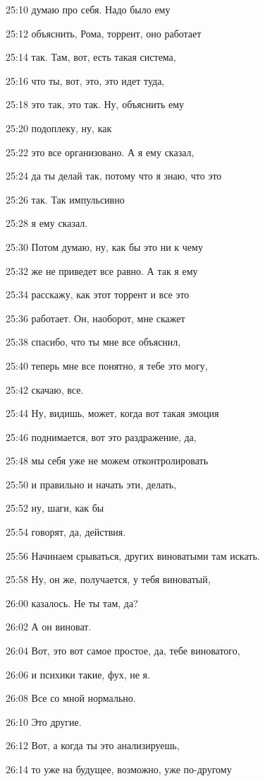 25:10
думаю про себя. Надо было ему

25:12
объяснить, Рома, торрент, оно работает

25:14
так. Там, вот, есть такая система,

25:16
что ты, вот, это, это идет туда,

25:18
это так, это так. Ну, объяснить ему

25:20
подоплеку, ну, как

25:22
это все организовано. А я ему сказал,

25:24
да ты делай так, потому что я знаю, что это

25:26
так. Так импульсивно

25:28
я ему сказал.

25:30
Потом думаю, ну, как бы это ни к чему

25:32
же не приведет все равно. А так я ему

25:34
расскажу, как этот торрент и все это

25:36
работает. Он, наоборот, мне скажет

25:38
спасибо, что ты мне все объяснил,

25:40
теперь мне все понятно, я тебе это могу,

25:42
скачаю, все.

25:44
Ну, видишь, может, когда вот такая эмоция

25:46
поднимается, вот это раздражение, да,

25:48
мы себя уже не можем отконтролировать

25:50
и правильно и начать эти, делать,

25:52
ну, шаги, как бы

25:54
говорят, да, действия.

25:56
Начинаем срываться, других виноватыми там искать.

25:58
Ну, он же, получается, у тебя виноватый,

26:00
казалось. Не ты там, да?

26:02
А он виноват.

26:04
Вот, это вот самое простое, да, тебе виноватого,

26:06
и психики такие, фух, не я.

26:08
Все со мной нормально.

26:10
Это другие.

26:12
Вот, а когда ты это анализируешь,

26:14
то уже на будущее, возможно, уже по-другому

